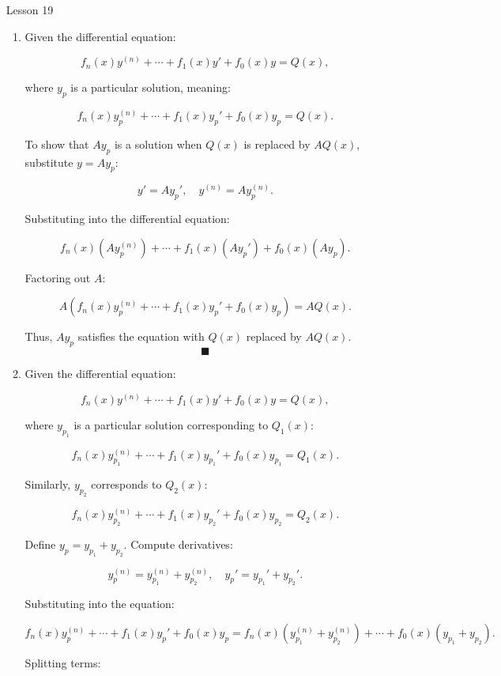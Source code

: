 \documentclass[12pt]{article}
\newcommand{\qed}[0]{$\blacksquare$}
\begin{document}
\begin{enumerate}
\item [Lesson 19]
\begin{enumerate}

\item 

Given the differential equation:

\[
f_n(x)y^{(n)} + \cdots + f_1(x)y' + f_0(x)y = Q(x),
\]

where $y_p$ is a particular solution, meaning:

\[
f_n(x)y_p^{(n)} + \cdots + f_1(x)y_p' + f_0(x)y_p = Q(x).
\]

To show that $A y_p$ is a solution when $Q(x)$ is replaced by $A Q(x)$, substitute $y = A y_p$:

\[
y' = A y_p', \quad y^{(n)} = A y_p^{(n)}.
\]

Substituting into the differential equation:

\[
f_n(x)(A y_p^{(n)}) + \cdots + f_1(x)(A y_p') + f_0(x)(A y_p).
\]

Factoring out $A$:

\[
A \left( f_n(x)y_p^{(n)} + \cdots + f_1(x)y_p' + f_0(x)y_p \right) = A Q(x).
\]

Thus, $A y_p$ satisfies the equation with $Q(x)$ replaced by $A Q(x)$. $\qed$

\item 

Given the differential equation:

\[
f_n(x)y^{(n)} + \cdots + f_1(x)y' + f_0(x)y = Q(x),
\]

where $y_{p_1}$ is a particular solution corresponding to $Q_1(x)$:

\[
f_n(x)y_{p_1}^{(n)} + \cdots + f_1(x)y_{p_1}' + f_0(x)y_{p_1} = Q_1(x).
\]

Similarly, $y_{p_2}$ corresponds to $Q_2(x)$:

\[
f_n(x)y_{p_2}^{(n)} + \cdots + f_1(x)y_{p_2}' + f_0(x)y_{p_2} = Q_2(x).
\]

Define $y_p = y_{p_1} + y_{p_2}$. Compute derivatives:

\[
y_p^{(n)} = y_{p_1}^{(n)} + y_{p_2}^{(n)}, \quad y_p' = y_{p_1}' + y_{p_2}'.
\]

Substituting into the equation:

\[
f_n(x)y_p^{(n)} + \cdots + f_1(x)y_p' + f_0(x)y_p = f_n(x)(y_{p_1}^{(n)} + y_{p_2}^{(n)}) + \cdots + f_0(x)(y_{p_1} + y_{p_2}).
\]

Splitting terms:


\end{enumerate}
\end{enumerate}
\end{document}
